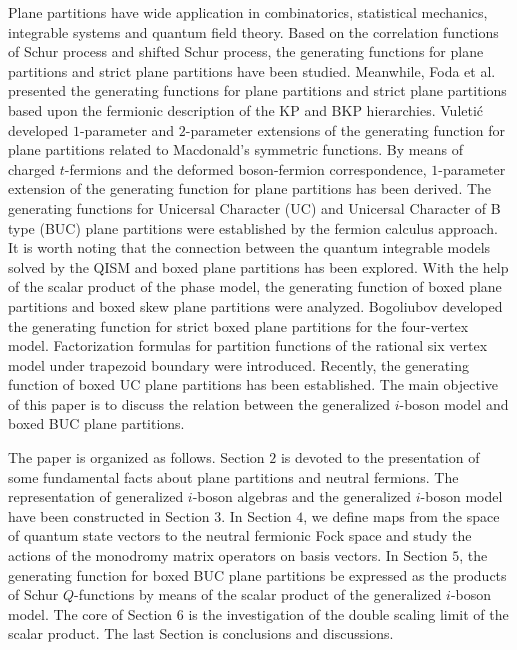 \documentclass[11pt,reqno]{amsart}
\numberwithin{equation}{section}
\begin{document}
	
Plane partitions\cite{MacMahon}  have wide application in combinatorics\cite{C1,C2}, statistical mechanics\cite{Statistical-1,Statistical-2}, integrable systems\cite{ferm} and quantum field theory\cite{bosonic}. Based on the correlation functions of Schur process and shifted Schur process, the generating functions for  plane partitions and strict plane partitions  have been  studied\cite{Schur-process,shifted-Schur-process}. Meanwhile, Foda et al.\cite{Foda06,Foda09} presented the generating functions for  plane partitions and strict plane partitions based upon the fermionic description of the KP  and BKP hierarchies.  Vuleti\'{c}\cite{2-parameter} developed $1$-parameter and $2$-parameter extensions of the generating function for plane partitions related to Macdonald's symmetric functions. By means of charged $t$-fermions and  the deformed boson-fermion correspondence\cite{Jing-B,Jing-F}, $1$-parameter extension of the generating function for plane partitions has been derived\cite{1-parameter}. The generating functions for Unicersal Character (UC) and  Unicersal Character of B type (BUC) plane partitions were established by  the fermion calculus approach\cite{UC-BUC}.
	It is worth noting that the connection between the quantum integrable models solved by the QISM and boxed plane partitions  has been explored.
	With the help of the scalar product of the phase model,
	the generating function of boxed plane partitions and boxed skew plane partitions were analyzed\cite{Boxed-q-boson-model,Boxed-skew-phase-model}.
	Bogoliubov \cite{Four-vertex-Model} developed the generating  function for strict boxed plane partitions for the four-vertex model.
Factorization formulas for  partition functions of the rational six vertex model  under trapezoid boundary were introduced\cite{Six-vertex-Model}.
	Recently, the generating function of boxed UC plane partitions has been established\cite{t-g-phase-model-boxed-UC}. The main objective of this paper is to discuss the  relation  between the   generalized $i$-boson model and boxed BUC plane partitions.
	
	
	
	The paper is organized as follows.
	Section $2$ is devoted to the presentation of some fundamental facts about
	plane partitions and neutral fermions.
	The representation of   generalized $i$-boson algebras and the   generalized $i$-boson model  have been constructed in Section $3$.
	In Section $4$, we  define  maps from the  space of quantum
	state vectors  to the neutral fermionic Fock space and study the actions of the monodromy matrix operators on  basis vectors.
	In Section $5$,  the generating function for  boxed BUC plane partitions  be expressed  as the products of Schur $Q$-functions by means of the scalar product of the   generalized $i$-boson model.
	The core of Section $6$  is the investigation of the double scaling limit of the scalar product. The last Section is conclusions and discussions.
	
\end{document}
